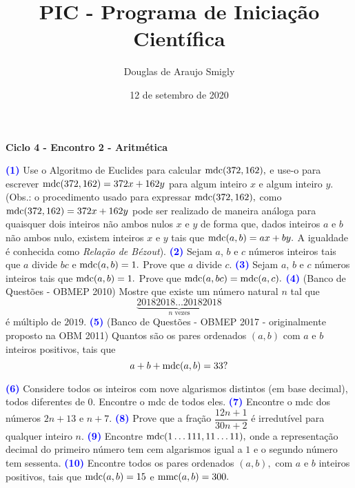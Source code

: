 \documentclass[12pt, a4paper]{article}
\title{PIC - Programa de Iniciação Científica}
\author{Douglas de Araujo Smigly}
\date{12 de setembro de 2020}
\newcommand{\mdc}{{\rm mdc}}
\newcommand{\mmc}{{\rm mmc}}
\begin{document}
\maketitle
\begin{center}
\large\textbf{\textcolor{Floresta}{Ciclo 4 - Encontro 2 - Aritmética}}\\
\end{center}
\textcolor{blue}{\bf(1)} Use o Algoritmo de Euclides para calcular $\mdc(372,162),$ e use-o para escrever $\mdc(372,162) = 372x + 162y$ para algum inteiro $x$ e algum inteiro $y.$
(Obs.: o procedimento usado para expressar $\mdc(372,162),$ como $\mdc(372,162) = 372x + 162y$ pode ser realizado de maneira análoga para quaisquer dois inteiros não
ambos nulos $x$ e $y$ de forma que, dados inteiros $a$ e $b$ não ambos nulo, existem inteiros $x$ e $y$ tais que $\mdc(a,b) = ax + by.$ A igualdade é conhecida como \textit{Relação de Bézout}).
\newline\newline
\textcolor{blue}{\bf(2)} Sejam $a$, $b$ e $c$ números inteiros tais que $a$ divide $bc$ e $\mdc(a,b) = 1.$ Prove que $a$ divide $c.$
\newline\newline
\textcolor{blue}{\bf(3)} Sejam $a$, $b$ e $c$ números inteiros tais que $\mdc(a,b) = 1.$ Prove que $\mdc(a,bc) = \mdc(a,c).$
\newline\newline
\textcolor{blue}{\bf(4)} (Banco de Questões - OBMEP 2010) Mostre que existe um número natural $n$ tal que
\[
\underbrace{20182018 \dots 20182018}_{n\text{ vezes}}
\]
é múltiplo de $2019.$
\newline\newline
\textcolor{blue}{\bf(5)} (Banco de Questões - OBMEP 2017 - originalmente proposto na OBM 2011) Quantos são os pares ordenados $(a,b)$ com $a$ e $b$ inteiros positivos, tais que 
\[a + b + \mdc(a,b) = 33?\]

\textcolor{blue}{\bf(6)} Considere todos os inteiros com nove algarismos distintos (em base decimal), todos diferentes de 0. Encontre o mdc de todos eles.
\newline\newline
\textcolor{blue}{\bf(7)} Encontre o mdc dos números $2n+13$ e $n+7.$
\newline\newline
\textcolor{blue}{\bf(8)} Prove que a fração $\dfrac{12n+1}{30n+2}$ é irredutível para qualquer inteiro $n.$
\newline\newline
\textcolor{blue}{\bf(9)} Encontre $\mdc(1 \dots 111,11\dots 11),$ onde a representação decimal do primeiro número tem cem algarismos igual a $1$ e o segundo número tem sessenta.
\newline
\newline
\textcolor{blue}{\bf(10)} Encontre todos os pares ordenados $(a,b),$ com $a$ e $b$ inteiros positivos, tais que
$\mdc(a,b) = 15$ e $\mmc(a,b) = 300.$ 
\end{document}
